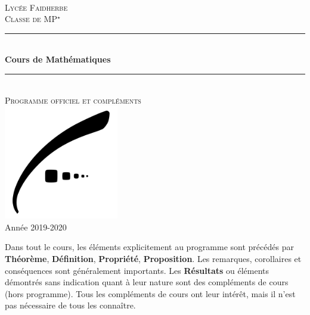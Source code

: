 \documentclass{report}
\begin{document}
\begin{center}

    ~ \vfill

    \textsc{\LARGE Lycée Faidherbe}\\[1.5cm]
    \textsc{\Large Classe de MP$^\star$}\\[0.5cm]

    \rule{\linewidth}{0.5mm} \\[0.4cm]
    {\huge \bfseries Cours de Mathématiques }\\[0.1cm]
    \rule{\linewidth}{0.5mm} \\[0.4cm]
    \textsc{\large Programme officiel et compléments}\\[1.5cm]

    \vfill
    \includegraphics[width=5cm]{faidherbe.pdf}\\[1cm]
    \vfill
    {\large Année 2019-2020}\\
\end{center}

\dominitoc \tableofcontents

Dans tout le cours, les éléments explicitement au programme sont précédés par \textbf{Théorème}, \textbf{Définition}, \textbf{Propriété}, \textbf{Proposition}. Les remarques, corollaires et conséquences sont généralement importants. Les \textbf{Résultats} ou éléments démontrés sans indication quant à leur nature sont des compléments de cours (hors programme). Tous les compléments de cours ont leur intérêt, mais il n'est pas nécessaire de tous les connaître.
\end{document}
